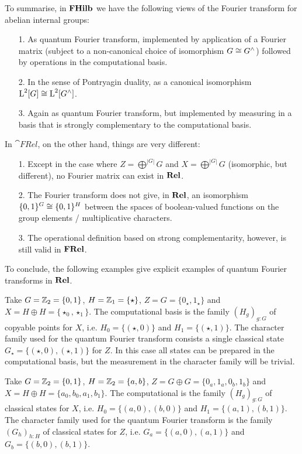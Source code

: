 To summarise, in $\mathbf{FHilb}$ we have the following views of the Fourier transform for abelian internal groups:
\begin{enumerate}
\item[1.] As quantum Fourier transform, implemented by application of a Fourier matrix (subject to a non-canonical choice of isomorphism $G \cong G^\wedge$) followed by operations in the computational basis.
\item[2.] In the sense of Pontryagin duality, as a canonical isomorphism $\operatorname{L}^2[G] \cong \operatorname{L}^2[G^\wedge]$.
\item[3.] Again as quantum Fourier transform, but implemented by measuring in a basis that is strongly complementary to the computational basis.
\end{enumerate}

In $\cat{FRel}$, on the other hand, things are very different:
\begin{enumerate}
\item[1.] Except in the case where $Z = \bigoplus^{|G|}G$ and $X = \bigoplus^{|G|}G$ (isomorphic, but different), no Fourier matrix can exist in $\mathbf{Rel}$.
\item[2.] The Fourier transform does not give, in $\mathbf{Rel}$, an isomorphism $\{0,1\}^G \cong \{0,1\}^H$ between the spaces of boolean-valued functions on the group elements / multiplicative characters.
\item[3.] The operational definition based on strong complementarity, however, is still valid in $\mathbf{FRel}$. 
\end{enumerate}

To conclude, the following examples give explicit examples of quantum Fourier transforms in $\mathbf{Rel}$.

\begin{example}
Take $G=\mathbb{Z}_{2}=\{0,1\}$, $H=\mathbb{Z}_{1}=\{\star\}$, $Z = G = \{ 0_\star,1_\star \}$ and $X=H\oplus H = \{ \star_0,\star_1 \}$. The computational basis is the family $(H_g)_{g:G}$ of copyable points for $X$, i.e. $H_0 = \{(\star,0)\}$ and $H_1 = \{(\star,1)\}$. The character family used for the quantum Fourier transform consists a single classical state $G_\star = \{(\star,0), (\star,1)\}$ for $Z$. In this case all states can be prepared in the computational basis, but the measurement in the character family will be trivial.
\end{example}

\begin{example}
Take $G=\mathbb{Z}_{2}=\{0,1\}$, $H=\mathbb{Z}_{2}=\{a,b\}$, $Z = G \oplus G = \{ 0_a,1_a,0_b,1_b\}$ and $X= H \oplus H = \{ a_0, b_0, a_1, b_1 \}$. The computational  is the family $(H_g)_{g:G}$ of classical states for $X$, i.e. $H_0 = \{(a,0),(b,0)\}$ and $H_1 = \{(a,1),(b,1)\}$. The character family used for the quantum Fourier transform is the family $(G_h)_{h:H}$ of classical states for $Z$, i.e. $G_a = \{(a,0),(a,1)\}$ and $G_b = \{(b,0),(b,1)\}$.
\end{example}


